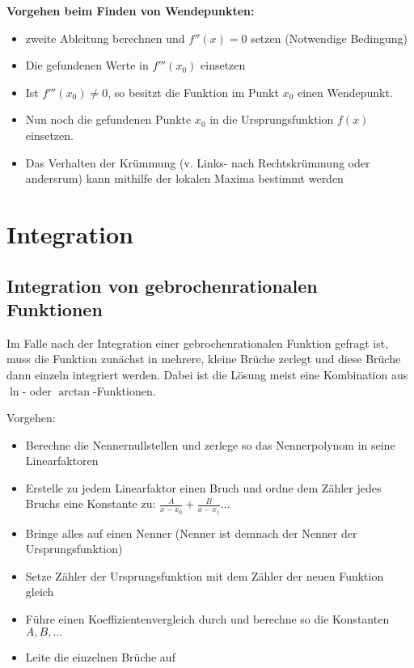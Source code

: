 \documentclass[12pt, a4paper]{scrreprt}
\begin{document}
\begin{framed}
  \textbf{Vorgehen beim Finden von Wendepunkten:}

  \begin{itemize}
  \item zweite Ableitung berechnen und \(f''(x) = 0\) setzen (Notwendige Bedingung)
  \item Die gefundenen Werte in \(f'''(x_0)\) einsetzen
  \item Ist \(f'''(x_0) \neq 0\), so besitzt die Funktion im Punkt \(x_0\) einen Wendepunkt.
  \item Nun noch die gefundenen Punkte \(x_0\) in die Ursprungsfunktion \(f(x)\) einsetzen.
  \item Das Verhalten der Krümmung (v. Links- nach Rechtskrümmung oder andersrum) kann mithilfe der lokalen Maxima bestimmt werden
  \end{itemize}
\end{framed}

\setcounter{chapter}{8}
\chapter{Integration}

\section{Integration von gebrochenrationalen Funktionen}

Im Falle nach der Integration einer gebrochenrationalen Funktion gefragt ist, muss die Funktion zunächst in mehrere, kleine Brüche zerlegt und diese Brüche dann einzeln integriert werden. Dabei ist die Lösung meist eine Kombination aus \(\ln\)- oder \(\arctan\)-Funktionen.

Vorgehen:
\begin{itemize}
\item Berechne die Nennernullstellen und zerlege so das Nennerpolynom in seine Linearfaktoren
\item Erstelle zu jedem Linearfaktor einen Bruch und ordne dem Zähler jedes Bruchs eine Konstante zu: \(\frac{A}{x-x_0} + \frac{B}{x-x_1} \dots\)
\item Bringe alles auf einen Nenner (Nenner ist demnach der Nenner der Ursprungsfunktion)
\item Setze Zähler der Ursprungsfunktion mit dem Zähler der neuen Funktion gleich
\item Führe einen Koeffizientenvergleich durch und berechne so die Konstanten \(A, B, \dots\)
\item Leite die einzelnen Brüche auf
\end{itemize}
\end{document}
